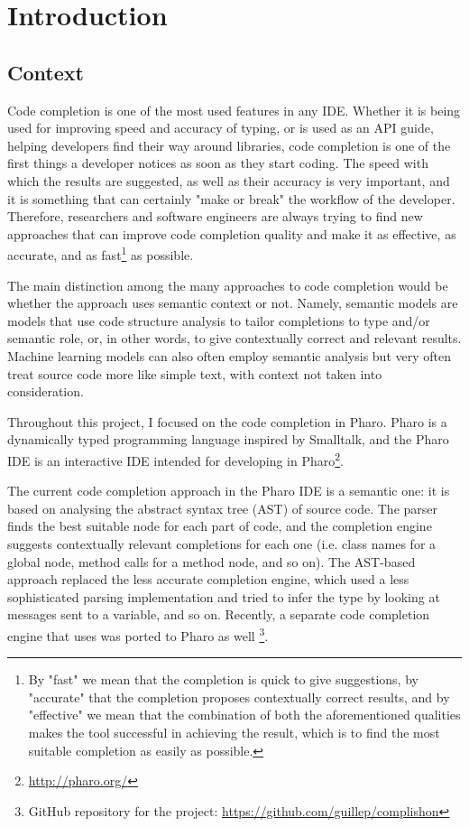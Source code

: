 \chapter{Introduction}
\label{chap:Introduction}

\section{Context}
\label{sec:Introduction-Context}
Code completion is one of the most used features in any IDE. Whether it is being used for improving speed and accuracy of typing, or is used as an API guide, helping developers find their way around libraries, code completion is one of the first things a developer notices as soon as they start coding. The speed with which the results are suggested, as well as their accuracy is very important, and it is something that can certainly "make or break" the workflow of the developer. Therefore, researchers and software engineers are always trying to find new approaches that can improve code completion quality and make it as effective, as accurate, and as fast\footnote{By "fast" we mean that the completion is quick to give suggestions, by "accurate" that the completion proposes contextually correct results, and by "effective" we mean that the combination of both the aforementioned qualities makes the tool successful in achieving the result, which is to find the most suitable completion as easily as possible.} as possible.

The main distinction among the many approaches to code completion would be whether the approach uses semantic context or not. Namely, semantic models are models that use code structure analysis to tailor completions to type and/or semantic role, or, in other words, to give contextually correct and relevant results. Machine learning models can also often employ semantic analysis but very often treat source code more like simple text, with context not taken into consideration.

Throughout this project, I focused on the code completion in Pharo. Pharo is a dynamically typed programming language inspired by Smalltalk, and the Pharo IDE is an interactive IDE intended for developing in Pharo\footnote{\url{http://pharo.org/}}.

The current code completion approach in the Pharo IDE is a semantic one: it is based on analysing the abstract syntax tree (AST) of source code. The parser finds the best suitable node for each part of code, and the completion engine suggests contextually relevant completions for each one (i.e. class names for a global node, method calls for a method node, and so on). The AST-based approach replaced the less accurate completion engine, which used a less sophisticated parsing implementation and tried to infer the type by looking at messages sent to a variable, and so on. Recently, a separate code completion engine that uses  was ported to Pharo as well \footnote{GitHub repository for the project: \url{https://github.com/guillep/complishon}}.

